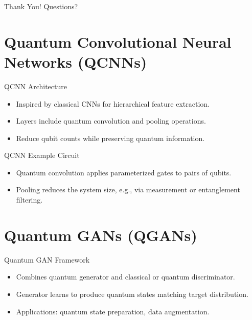 \documentclass{beamer}
\begin{document}
\begin{frame}{Thank You!}
  \centering
  \Huge Questions?
\end{frame}


\section{Quantum Convolutional Neural Networks (QCNNs)}
\begin{frame}{QCNN Architecture}
  \begin{itemize}
    \item Inspired by classical CNNs for hierarchical feature extraction.
    \item Layers include quantum convolution and pooling operations.
    \item Reduce qubit counts while preserving quantum information.
  \end{itemize}
\end{frame}

\begin{frame}{QCNN Example Circuit}
\begin{itemize}
  \item Quantum convolution applies parameterized gates to pairs of qubits.
  \item Pooling reduces the system size, e.g., via measurement or entanglement filtering.
\end{itemize}
\begin{center}
\end{center}
\end{frame}

\section{Quantum GANs (QGANs)}
\begin{frame}{Quantum GAN Framework}
  \begin{itemize}
    \item Combines quantum generator and classical or quantum discriminator.
    \item Generator learns to produce quantum states matching target distribution.
    \item Applications: quantum state preparation, data augmentation.
  \end{itemize}
\end{frame}
\end{document}
